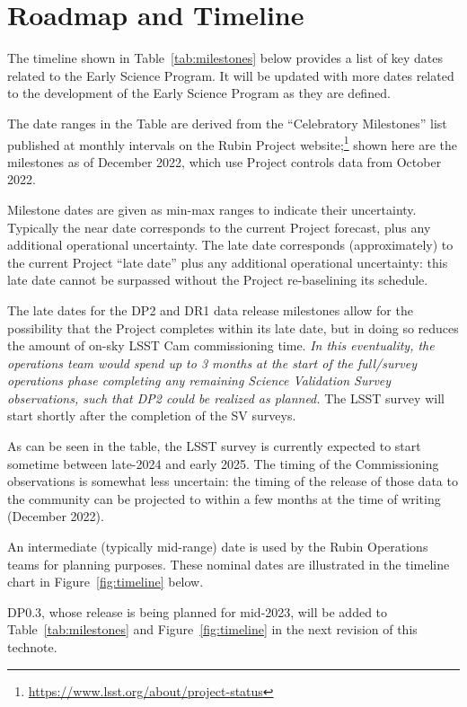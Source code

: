 \section{Roadmap and Timeline} \label{sec:timeline}

The timeline shown in Table~\ref{tab:milestones} below provides a list of key dates related to the Early Science Program.
It will be updated with more dates related to the development of the Early Science Program as they are defined.

The date ranges in the Table are derived from the ``Celebratory Milestones'' list published at monthly intervals on the Rubin Project website;\footnote{\url{https://www.lsst.org/about/project-status}} shown here are the milestones as of December 2022, which use Project controls data from October 2022.

Milestone dates are given as min-max ranges to indicate their uncertainty.
Typically the near date corresponds to the current Project forecast, plus any additional operational uncertainty.
The late date corresponds (approximately) to the current Project ``late date'' plus any additional operational uncertainty: this late date cannot be surpassed without the Project re-baselining its schedule.

The late dates for the DP2 and DR1 data release milestones allow for the possibility that the Project completes within its late date, but in doing so reduces the amount of on-sky LSST Cam commissioning time.
{\it In this eventuality, the operations team would spend up to 3 months at the start of the full/survey operations phase completing any remaining Science Validation Survey observations, such that DP2 could be realized as planned.}
The LSST survey will start shortly after the completion of the SV surveys.

As can be seen in the table, the LSST survey is currently expected to start sometime between late-2024 and early 2025.
The timing of the Commissioning observations is somewhat less uncertain: the timing of the release of those data to the community can be projected to within a few months at the time of writing (December 2022).

An intermediate (typically mid-range) date is used by the Rubin Operations teams for planning purposes. These nominal dates are illustrated in the timeline chart in Figure~\ref{fig:timeline} below.

DP0.3, whose release is being planned for mid-2023, will be added to Table~\ref{tab:milestones} and Figure~\ref{fig:timeline} in the next revision of this technote. 

